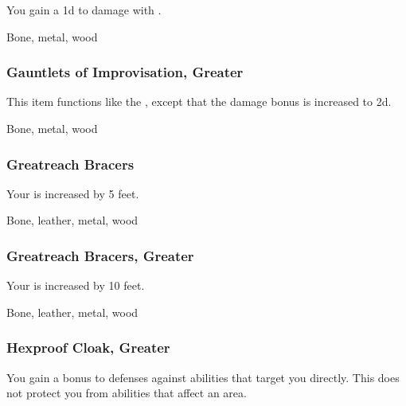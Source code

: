 You gain a \plus1d  to damage with .



 Bone, metal, wood


\lowercase{\hypertarget{item:Gauntlets of Improvisation, Greater}{}}\label{item:Gauntlets of Improvisation, Greater}
\hypertarget{item:Gauntlets of Improvisation, Greater}{\subsubsection{Gauntlets of Improvisation, Greater\hfill{}}}

This item functions like the , except that the damage bonus is increased to \plus2d.



 Bone, metal, wood


\lowercase{\hypertarget{item:Greatreach Bracers}{}}\label{item:Greatreach Bracers}
\hypertarget{item:Greatreach Bracers}{\subsubsection{Greatreach Bracers\hfill{}}}

Your  is increased by 5 feet.



 Bone, leather, metal, wood


\lowercase{\hypertarget{item:Greatreach Bracers, Greater}{}}\label{item:Greatreach Bracers, Greater}
\hypertarget{item:Greatreach Bracers, Greater}{\subsubsection{Greatreach Bracers, Greater\hfill{}}}

Your  is increased by 10 feet.



 Bone, leather, metal, wood


\lowercase{\hypertarget{item:Hexproof Cloak, Greater}{}}\label{item:Hexproof Cloak, Greater}
\hypertarget{item:Hexproof Cloak, Greater}{\subsubsection{Hexproof Cloak, Greater\hfill{}}}

You gain a  bonus to defenses against  abilities that target you directly.
This does not protect you from abilities that affect an area.



